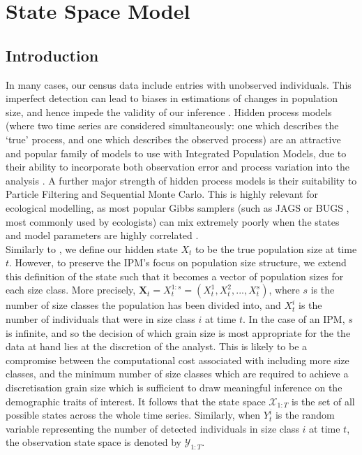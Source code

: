 \documentclass[a4paper,12pt]{article}
\begin{document}
\newpage
\section{State Space Model}

\subsection{Introduction}
In many cases, our census data include entries with unobserved individuals. This imperfect detection can lead to biases in estimations of changes in population size, and hence impede the validity of our inference \citep{gimenezRisk}. Hidden process models (where two time series are considered simultaneously: one which describes the `true' process, and one which describes the observed process) are an attractive and popular family of models to use with Integrated Population Models, due to their ability to incorporate both observation error and process variation into the analysis \citep{gimenezHPM}. A further major strength of hidden process models is their suitability to Particle Filtering and Sequential Monte Carlo. This is highly relevant for ecological modelling, as most popular Gibbs samplers (such as JAGS \citep{JAGS} or BUGS \citep{BUGS}, most commonly used by ecologists) can mix extremely poorly when the states and model parameters are highly correlated \citep{Finke}. \\

Similarly to \citet{Finke}, we define our hidden state $X_t$ to be the true population size at time $t$. However, to preserve the IPM's focus on population size structure, we extend this definition of the state such that it becomes a vector of population sizes for each size class. More precisely, $\boldsymbol{X}_t = X_t^{1:s} = (X_{t}^1, X_{t}^2, ..., X_{t}^s)$, where $s$ is the number of size classes the population has been divided into, and $X_{t}^i$ is the number of individuals that were in size class $i$ at time $t$. In the case of an IPM, $s$ is infinite, and so the decision of which grain size is most appropriate for the the data at hand lies at the discretion of the analyst. This is likely to be a compromise between the computational cost associated with including more size classes, and the minimum number of size classes which are required to achieve a discretisation grain size which is sufficient to draw meaningful inference on the demographic traits of interest. It follows that the state space $\boldsymbol{\mathcal{X}}_{1:T}$ is the set of all possible states across the whole time series. Similarly, when $Y_{t}^i$ is the random variable representing the number of detected individuals in size class $i$ at time $t$, the observation state space is denoted by $\boldsymbol{\mathcal{Y}}_{1:T}$.\\
\end{document}
